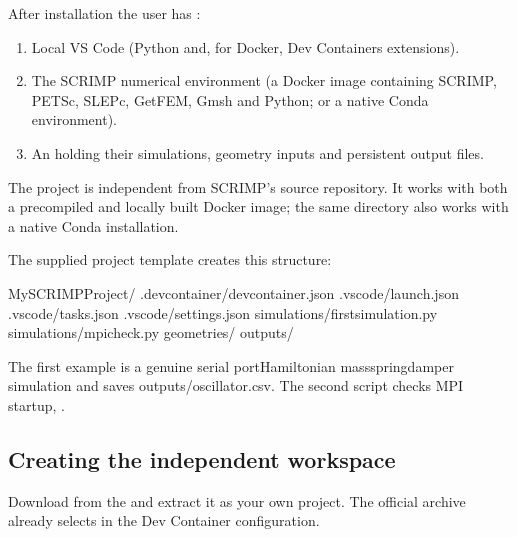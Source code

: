 \documentclass[letterpaper,10pt,english]{sphinxmanual}
\begin{document}
\sphinxAtStartPar
After installation the user has :
\begin{enumerate}
%
\item {} 
\sphinxAtStartPar
Local VS Code (Python and, for Docker, Dev Containers extensions).

\item {} 
\sphinxAtStartPar
The SCRIMP numerical environment (a Docker image containing SCRIMP,
PETSc, SLEPc, GetFEM, Gmsh and Python; or a native Conda environment).

\item {} 
\sphinxAtStartPar
An  holding their simulations, geometry
inputs and persistent output files.

\end{enumerate}

\sphinxAtStartPar
The project is independent from SCRIMP’s source repository. It works
with both a precompiled and locally built Docker image; the same
directory also works with a native Conda installation.

\sphinxAtStartPar
The supplied project template creates this structure:

\begin{sphinxVerbatim}[commandchars=\\\{\}]
MySCRIMPProject/
  .devcontainer/devcontainer.json
  .vscode/launch.json
  .vscode/tasks.json
  .vscode/settings.json
  simulations/first\PYGZus{}simulation.py
  simulations/mpi\PYGZus{}check.py
  geometries/
  outputs/
\end{sphinxVerbatim}

\sphinxAtStartPar
The first example is a genuine serial port\sphinxhyphen{}Hamiltonian
mass\sphinxhyphen{}spring\sphinxhyphen{}damper simulation and saves outputs/oscillator.csv.
The second script checks MPI startup, .


\subsection{Creating the independent workspace}
\label{\detokenize{vscode:creating-the-independent-workspace}}
\sphinxAtStartPar
Download  from the
and extract it as your own project. The official archive
already selects  in the
Dev Container configuration.
\end{document}
